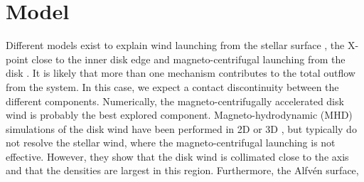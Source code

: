 \section{Model}
Different models exist to explain wind launching from the stellar surface \citep{http://adsabs.harvard.edu/abs/1988ApJ...332L..41K,http://adsabs.harvard.edu/abs/2005ApJ...632L.135M}, the X-point close to the inner disk edge \citep{http://adsabs.harvard.edu/abs/1994ApJ...429..781S} and magneto-centrifugal launching from the disk \citep{http://adsabs.harvard.edu/abs/1982MNRAS.199..883B,http://adsabs.harvard.edu/abs/2005ApJ...630..945A}. It is likely that more than one mechanism contributes to the total outflow from the system. In this case, we expect a contact discontinuity between the different components. Numerically, the magneto-centrifugally accelerated disk wind is probably the best explored component. Magneto-hydrodynamic (MHD) simulations of the disk wind have been performed in 2D \citep{http://adsabs.harvard.edu/abs/2005ApJ...630..945A} or 3D \citep{http://adsabs.harvard.edu/abs/2006ApJ...653L..33A}, but typically do not resolve the stellar wind, where the magneto-centrifugal launching is not effective. However, they show that the disk wind is collimated close to the axis and that the densities are largest in this region. Furthermore, the Alfv\'en surface, 
